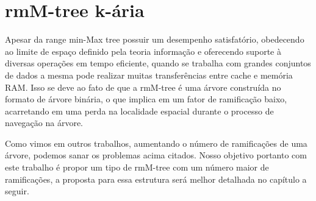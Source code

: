 



\section{rmM-tree k-ária}
Apesar da range min-Max tree possuir um desempenho satisfatório, obedecendo ao limite de espaço definido pela teoria informação e oferecendo suporte à diversas operações em tempo eficiente,
quando se trabalha com grandes conjuntos de dados a mesma pode realizar muitas transferências entre cache e memória RAM.
Isso se deve ao fato de que a rmM-tree é uma árvore construída no formato de árvore binária, o que implica em um fator de ramificação baixo, acarretando em uma perda na localidade espacial durante o processo de navegação na árvore.

Como vimos em outros trabalhos, aumentando o número de ramificações de uma árvore, podemos sanar os problemas acima citados.
Nosso objetivo portanto com este trabalho é propor um tipo de rmM-tree com um número maior de ramificações, a proposta para essa estrutura será melhor detalhada no capítulo a seguir.

